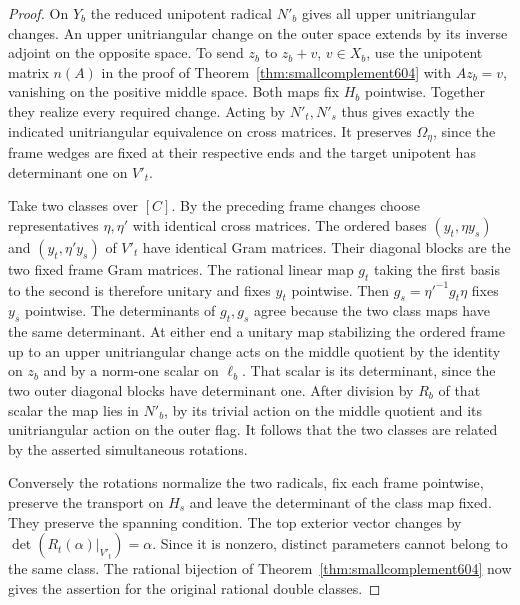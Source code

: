 \documentclass[a4paper,11pt]{article}
\theoremstyle{definition}
\theoremstyle{remark}
\numberwithin{equation}{section}
\begin{document}
\begin{proof}
On \(Y_b\) the reduced unipotent radical \(N'_b\) gives all upper
unitriangular changes. An upper unitriangular change on the outer
space extends by its inverse adjoint on the opposite space.
To send \(z_b\) to \(z_b+v\), \(v\in X_b\), use the unipotent
matrix \(n(A)\) in the proof of Theorem~\ref{thm:smallcomplement604}
with \(A z_b=v\), vanishing on the positive middle space. Both
maps fix \(H_b\) pointwise. Together they realize every required
change. Acting by \(N'_t,N'_s\) thus gives exactly the indicated
unitriangular equivalence on cross matrices. It preserves
\(\Omega_\eta\), since the frame wedges are fixed at their
respective ends and the target unipotent has determinant one
on \(V'_t\).

Take two classes over \([C]\). By the preceding frame changes
choose representatives \(\eta,\eta'\) with identical cross
matrices. The ordered bases \((y_t,\eta y_s)\) and
\((y_t,\eta' y_s)\) of \(V'_t\) have identical Gram matrices.
Their diagonal blocks are the two fixed frame Gram matrices.
The rational linear map \(g_t\) taking the first basis to the
second is therefore unitary and fixes \(y_t\) pointwise.
Then \(g_s=\eta'^{-1}g_t\eta\) fixes \(y_s\) pointwise.
The determinants of \(g_t,g_s\) agree because the two class
maps have the same determinant. At either end a unitary map
stabilizing the ordered frame up to an upper unitriangular
change acts on the middle quotient by the identity on \(z_b\)
and by a norm-one scalar on \(\ell_b\). That scalar is its
determinant, since the two outer diagonal blocks have determinant
one. After division by \(R_b\) of that scalar the map lies in
\(N'_b\), by its trivial action on the middle quotient and its
unitriangular action on the outer flag. It follows that the two
classes are related by the asserted simultaneous rotations.

Conversely the rotations normalize the two radicals, fix each
frame pointwise, preserve the transport on \(H_s\) and leave the
determinant of the class map fixed. They preserve the spanning
condition. The top exterior vector changes by
\(\det(R_t(\alpha)|_{V'_t})=\alpha\). Since it is nonzero, distinct
parameters cannot belong to the same class. The rational bijection
of Theorem~\ref{thm:smallcomplement604} now gives the assertion
for the original rational double classes.
\end{proof}
\end{document}
